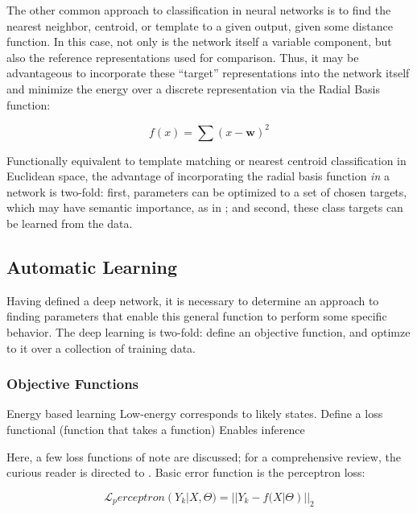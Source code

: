 The other common approach to classification in neural networks is to find the nearest neighbor, centroid, or template to a given output, given some distance function.
In this case, not only is the network itself a variable component, but also the reference representations used for comparison.
Thus, it may be advantageous to incorporate these ``target'' representations into the network itself and minimize the energy over a discrete representation via the Radial Basis function:

\begin{equation}
f(x) = \sum(x - \mathbf{w})^2
\end{equation}

\noindent Functionally equivalent to template matching or nearest centroid classification in Euclidean space, the advantage of incorporating the radial basis function \emph{in} a network is two-fold:
first, parameters can be optimized to a set of chosen targets, which may have semantic importance, as in \cite{LeCun1998};
and second, these class targets can be learned from the data.


\subsection{Automatic Learning}
\label{subsec:learning}

Having defined a deep network, it is necessary to determine an approach to finding parameters that enable this general function to perform some specific behavior.
The deep learning is two-fold: define an objective function, and optimze to it over a collection of training data.


\subsubsection{Objective Functions}

Energy based learning
Low-energy corresponds to likely states.
Define a loss functional (function that takes a function)
Enables inference

Here, a few loss functions of note are discussed; for a comprehensive review, the curious reader is directed to \cite{LeCun2006}.
Basic error function is the perceptron loss:

\begin{equation}
\label{eq:nll}
\mathcal{L}_perceptron(Y_k | X, \Theta) = || Y_k - f(X | \Theta) ||_2
\end{equation}

